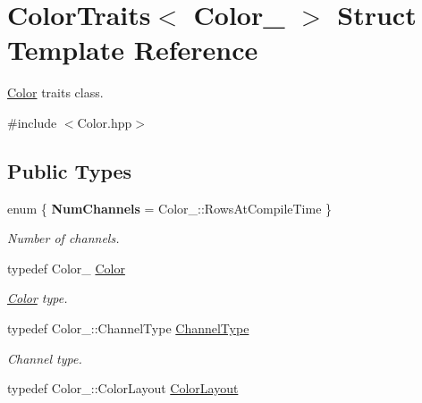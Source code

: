 \hypertarget{struct_d_o_1_1_color_traits}{\section{Color\-Traits$<$ Color\-\_\- $>$ Struct Template Reference}
\label{struct_d_o_1_1_color_traits}
}


\hyperlink{class_d_o_1_1_color}{Color} traits class.  




{\ttfamily \#include $<$Color.\-hpp$>$}

\subsection*{Public Types}
\begin{DoxyCompactItemize}
\item 
enum \{ {\bfseries Num\-Channels} = Color\-\_\-\-:\-:Rows\-At\-Compile\-Time
 \}
\begin{DoxyCompactList}\small\item\em Number of channels. \end{DoxyCompactList}\item 
\hypertarget{struct_d_o_1_1_color_traits_a8d45fa3ac7947ce1caba83d2bad66677}{typedef Color\-\_\- \hyperlink{struct_d_o_1_1_color_traits_a8d45fa3ac7947ce1caba83d2bad66677}{Color}}\label{struct_d_o_1_1_color_traits_a8d45fa3ac7947ce1caba83d2bad66677}

\begin{DoxyCompactList}\small\item\em \hyperlink{class_d_o_1_1_color}{Color} type. \end{DoxyCompactList}\item 
\hypertarget{struct_d_o_1_1_color_traits_ad14c104c9edbe1cd9020ea82f3cdb0f5}{typedef Color\-\_\-\-::\-Channel\-Type \hyperlink{struct_d_o_1_1_color_traits_ad14c104c9edbe1cd9020ea82f3cdb0f5}{Channel\-Type}}\label{struct_d_o_1_1_color_traits_ad14c104c9edbe1cd9020ea82f3cdb0f5}

\begin{DoxyCompactList}\small\item\em Channel type. \end{DoxyCompactList}\item 
\hypertarget{struct_d_o_1_1_color_traits_a1936ea193f7f09f57144dd97e0fd7969}{typedef Color\-\_\-\-::\-Color\-Layout \hyperlink{struct_d_o_1_1_color_traits_a1936ea193f7f09f57144dd97e0fd7969}{Color\-Layout}}\label{struct_d_o_1_1_color_traits_a1936ea193f7f09f57144dd97e0fd7969}


\end{DoxyCompactItemize}
